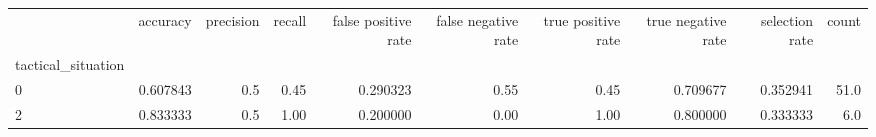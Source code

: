 \begin{tabular}{lrrrrrrrrr}
\toprule
{} &  accuracy &  precision &  recall &  false positive rate &  false negative rate &  true positive rate &  true negative rate &  selection rate &  count \\
tactical\_situation &           &            &         &                      &                      &                     &                     &                 &        \\
\midrule
0                  &  0.607843 &        0.5 &    0.45 &             0.290323 &                 0.55 &                0.45 &            0.709677 &        0.352941 &   51.0 \\
2                  &  0.833333 &        0.5 &    1.00 &             0.200000 &                 0.00 &                1.00 &            0.800000 &        0.333333 &    6.0 \\
\bottomrule
\end{tabular}
